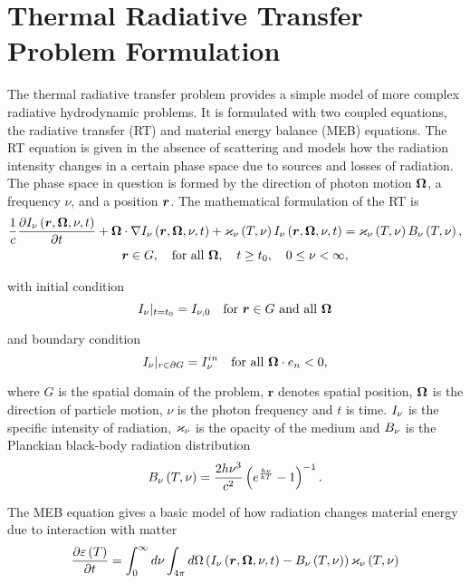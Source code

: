 \section{Thermal Radiative Transfer Problem Formulation}
	The thermal radiative transfer problem provides a simple model of more complex radiative hydrodynamic problems. It is formulated with two coupled equations, the radiative transfer (RT) and material energy balance (MEB) equations. The RT equation is given in the absence of scattering and models how the radiation intensity changes in a certain phase space due to sources and losses of radiation. The phase space in question is formed by the direction of photon motion $\bm{\Omega}$, a frequency $\nu$, and a position $\bm{r}$. The mathematical formulation of the RT is 
	\begin{gather}
		\frac{1}{c}\frac{\partial I_{\nu}\left(\bm{r},\bm{\Omega},\nu,t\right)}{\partial t} + \bm{\Omega}\cdot\nabla I_{\nu}\left(\bm{r},\bm{\Omega},\nu,t\right) + \varkappa_{\nu}\left( T,\nu\right)I_{\nu}\left(\bm{r},\bm{\Omega},\nu,t\right) = \varkappa_{\nu}\left( T,\nu\right)B_{\nu}\left( T,\nu\right), \label{General_RT_eqn}\\
		\bm{r} \in G, \quad \text{for all } \bm{\Omega}, \quad t\geq t_0, \quad 0\leq \nu < \infty, \nonumber
	\end{gather}
	
	with initial condition
	\begin{equation}
		I_{\nu}|_{t=t_0} = I_{\nu,0} \quad \text{for } \bm{r} \in G \text{ and all } \bm{\Omega}
	\end{equation}
	
	and boundary condition
	\begin{equation}
		I_{\nu}|_{r\in\partial G} = I_{\nu}^{in} \quad \text{for all } \bm{\Omega}\cdot e_n < 0,
	\end{equation}
	
	where $G$ is the spatial domain of the problem, $\bm{r}$ denotes spatial position, $\bm{\Omega}$ is the direction of particle motion, $\nu$ is the photon frequency and $t$ is time. $I_{\nu}$ is the specific intensity of radiation, $\varkappa_{\nu}$ is the opacity of the medium and $B_{\nu}$ is the Planckian black-body radiation distribution
	\begin{equation}
		B_{\nu}\left( T,\nu\right) = \frac{2h\nu^3}{c^2}\left( e^{\frac{h\nu}{kT}} - 1\right)^{-1}.
	\end{equation}
	
	The MEB equation gives a basic model of how radiation changes material energy due to interaction with matter
	\begin{equation}
		\frac{\partial \varepsilon\left( T\right)}{\partial t} = \int_{0}^{\infty}d\nu \int_{4\pi}d\Omega \left(I_{\nu}\left(\bm{r},\bm{\Omega},\nu,t\right) - B_{\nu}\left( T,\nu\right)\right)\varkappa_{\nu}\left( T,\nu\right) \label{Energy_Balance}
	\end{equation}
	
